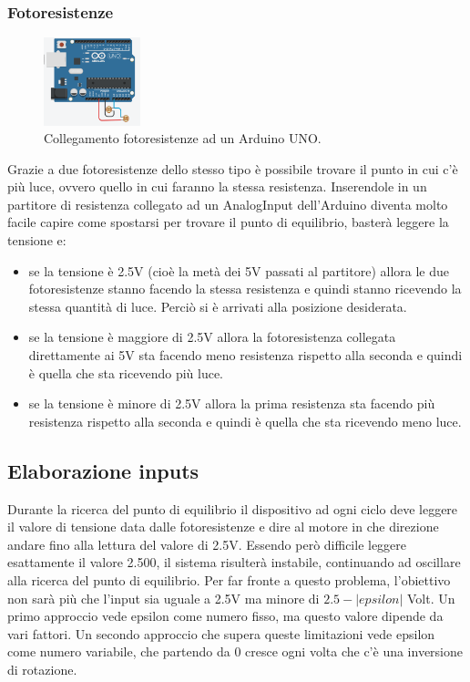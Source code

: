 \documentclass[12pt,oneside,a4paper]{article}
\begin{document}
\subsubsection{Fotoresistenze}
\begin{figure}
    \centering
    \includegraphics[width=0.25\textwidth]{figures/photoresistors}
    \caption{Collegamento fotoresistenze ad un Arduino UNO.}
\end{figure}
Grazie a due fotoresistenze dello stesso tipo è possibile trovare il punto in cui c'è più luce, ovvero quello in cui faranno la stessa resistenza.
Inserendole in un partitore di resistenza collegato ad un AnalogInput dell'Arduino diventa molto facile capire come spostarsi per trovare il punto di equilibrio, basterà leggere la tensione e:
\begin{itemize}
    \item se la tensione è 2.5V (cioè la metà dei 5V passati al partitore) allora le due fotoresistenze stanno facendo la stessa resistenza e quindi stanno ricevendo la stessa quantità di luce. Perciò si è arrivati alla posizione desiderata.
    \item se la tensione è maggiore di 2.5V allora la fotoresistenza collegata direttamente ai 5V sta facendo meno resistenza rispetto alla seconda e quindi è quella che sta ricevendo più luce.
    \item se la tensione è minore di 2.5V allora la prima resistenza sta facendo più resistenza rispetto alla seconda e quindi è quella che sta ricevendo meno luce.
\end{itemize}

\subsection{Elaborazione inputs}
Durante la ricerca del punto di equilibrio il dispositivo ad ogni ciclo deve leggere il valore di tensione data dalle fotoresistenze e dire al motore in che direzione andare fino alla lettura del valore di 2.5V. Essendo però difficile leggere esattamente il valore 2.500, il sistema risulterà instabile, continuando ad oscillare alla ricerca del punto di equilibrio. Per far fronte a questo problema, l'obiettivo non sarà più che l'input sia uguale a 2.5V ma minore di $2.5 - |epsilon|$ Volt.
Un primo approccio vede epsilon come numero fisso, ma questo valore dipende da vari fattori. Un secondo approccio che supera queste limitazioni vede epsilon come numero variabile, che partendo da 0 cresce ogni volta che c'è una inversione di rotazione.
\end{document}
